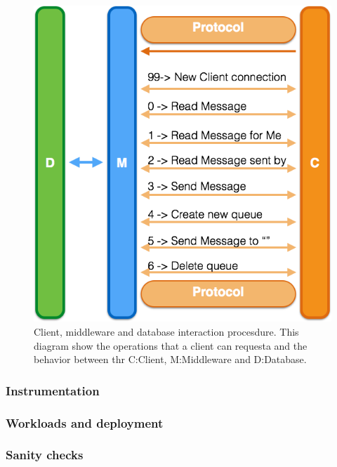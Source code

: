 \begin{figure}[h!]
	\centering
	\includegraphics[scale=0.3]{prtocol.png}
	\caption{Client, middleware and database interaction procesdure. This diagram show the operations that a client can requesta and the behavior between thr C:Client, M:Middleware and D:Database.}
	\label{interaction}
\end{figure}

\subsubsection{Instrumentation}\label{sec:instrumentation}

\subsubsection{Workloads and deployment}\label{sec:workloads-and-deployment}

\subsubsection{Sanity checks}\label{sec:sanity-checks}